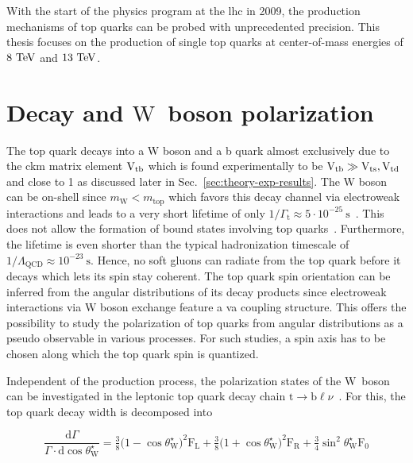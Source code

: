 With the start of the physics program at the \gls{lhc} in 2009, the production mechanisms of top quarks can be probed with unprecedented precision. This thesis focuses on the production of single top quarks at center-of-mass energies of $8~\mathrm{TeV}$ and $13~\mathrm{TeV}$.


\section{Decay and $\mathrm{W}$~boson polarization}
\label{sec:theory-top-quark-decay}

The top quark decays into a W boson and a b quark almost exclusively due to the \gls{ckm} matrix element ${\mathrm{V}_\mathrm{tb}}$ which is found experimentally to be ${\mathrm{V}_\mathrm{tb}}\gg{\mathrm{V}_\mathrm{ts}},{\mathrm{V}_\mathrm{td}}$ and close to 1 as discussed later in Sec.~\ref{sec:theory-exp-results}. The W boson can be on-shell since $m_\mathrm{W}<m_\mathrm{top}$ which favors this decay channel via electroweak interactions and leads to a very short lifetime of only $1/\Gamma_\mathrm{t}\approx 5\cdot10^{-25}~\mathrm{s}$~\cite{Olive:2016xmw}. This does not allow the formation of bound states involving top quarks~\cite{BIGI1986157}. Furthermore, the lifetime is even shorter than the typical hadronization timescale of $1/\Lambda_\mathrm{QCD}\approx 10^{-23}~\mathrm{s}$. Hence, no soft gluons can radiate from the top quark before it decays which lets its spin stay coherent. The top quark spin orientation can be inferred from the angular distributions of its decay products since electroweak interactions via $\mathrm{W}$ boson exchange feature a \gls{va} coupling structure. This offers the possibility to study the polarization of top quarks from angular distributions as a pseudo observable in various processes. For such studies, a spin axis has to be chosen along which the top quark spin is quantized.

Independent of the production process, the polarization states of the $\mathrm{W}$~boson can be investigated in the leptonic top quark decay chain $\mathrm{t}\to\mathrm{b}\ell\nu$~\cite{AguilarSaavedra:2010nx}. For this, the top quark decay width is decomposed into

\begin{equation}
\frac{\mathrm{d}\Gamma}{\Gamma\cdot\mathrm{d}\cos\theta^\star_\mathrm{W}}=\tfrac{3}{8}\big(1-\cos\theta^\star_\mathrm{W}\big)^{2}\mathrm{F}_\mathrm{L}+\tfrac{3}{8}\big(1+\cos\theta^\star_\mathrm{W}\big)^{2}\mathrm{F}_\mathrm{R}+\tfrac{3}{4}\sin^{2}\theta^\star_\mathrm{W}\mathrm{F}_{0} \label{eq:theory-diff-whel-fractions}
\end{equation}

